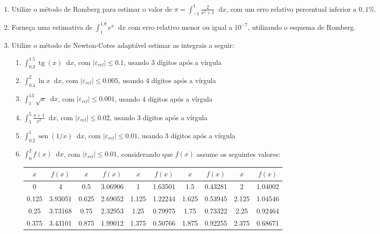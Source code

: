 \documentclass[12pt,a4paper]{article}
\newcommand*\sen{\operatorname{sen}}
\newcommand*\tg{\operatorname{tg}}
\newcommand*\diff{\mathop{}\!\mathrm{d}}
\begin{document}
\begin{enumerate}
\item Utilize o método de Romberg para estimar o valor de $\pi = \int_{-1}^1 \frac{2}{x^2 + 1}\diff{x}$, com um erro relativo percentual inferior a $0,1\%$.

\item Forneça uma estimativa de $\int_1^{1.8} e^x\diff{x}$ com erro relativo menor ou igual a $10^{-7}$, utilizando o esquema de Romberg.

\item Utilize o método de Newton-Cotes adaptável estimar as integrais a seguir:
\begin{enumerate}
\item $\int_{0.3}^{1.5} \tg(x)\diff{x}$, com $|\varepsilon_{rel}| \leq 0.1$, usando 3 dígitos após a vírgula
\item $\int_{0.4}^{2} \ln{x}\diff{x}$, com $|\varepsilon_{rel}| \leq 0.005$, usando 4 dígitos após a vírgula
\item $\int_{1}^{13} \sqrt{x}\diff{x}$, com $|\varepsilon_{rel}| \leq 0.001$, usando 4 dígitos após a vírgula
\item $\int_1^5 \frac{x+1}{x^2}\diff{x}$, com $|\varepsilon_{rel}| \leq 0.02$, usando 3 dígitos após a vírgula
\item $\int_{0.2}^{1} \sen(1/x)\diff{x}$, com $|\varepsilon_{rel}| \leq 0.01$, usando 3 dígitos após a vírgula
\item $\int_{0}^{2} f(x)\diff{x}$, com $|\varepsilon_{rel}| \leq 0.01$, considerando que $f(x)$ assume os seguintes valores:
\begin{center}\hspace{-1cm}
\begin{tabular}{|c|c||c|c||c|c||c|c||c|c|}
\hline
$x$ & $f(x)$ & $x$ & $f(x)$ & $x$ & $f(x)$ & $x$ & $f(x)$ & $x$ & $f(x)$\\
\hline
0 & 4 & 0.5 & 3.06906 & 1 & 1.63501 & 1.5 & 0.43281 & 2 & 1.04002\\
\hline
0.125 & 3.93051 & 0.625 & 2.69052 & 1.125 & 1.22244 & 1.625 & 0.53945 & 2.125 & 1.04546\\
\hline
0.25 & 3.73168 & 0.75 & 2.32953 & 1.25 & 0.79975 & 1.75 & 0.73322 & 2.25 & 0.92464\\
\hline
0.375 & 3.43101 & 0.875 & 1.99012 & 1.375 & 0.50766 & 1.875 & 0.92255 & 2.375 & 0.68671\\
\hline
\end{tabular}
\end{center}
\end{enumerate}
\end{enumerate}
\end{document}

